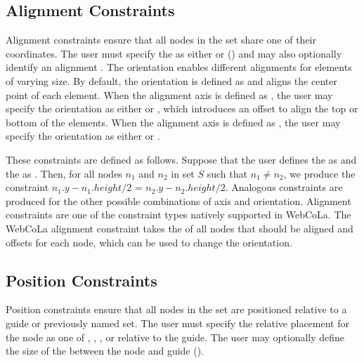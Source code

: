 \subsection{Alignment Constraints}
Alignment constraints ensure that all nodes in the set share one of their
coordinates. The user must specify the 
as either  or  () 
and may also optionally identify an alignment .
The orientation enables different alignments for elements of varying size. 
By default, the orientation is defined as 
and aligns the center point of each element. When the alignment axis is defined as ,
the user may specify the orientation as either  or , which introduces
an offset to align the top or bottom of the elements. When the alignment axis is 
defined as , the user may specify the orientation as either 
 or .

These constraints are defined as follows. Suppose that the user defines the 
as  and the  as .  Then, for all
nodes $n_1$ and $n_2$ in set $S$ such that $n_1 \neq n_2$, we produce the constraint
$n_1.y - n_1.height/2$ = $n_2.y - n_2.height/2$.
Analogous constraints are produced for the other possible combinations of axis and orientation.
Alignment constraints are one of the constraint types natively supported in
WebCoLa. The WebCoLa alignment constraint takes the  of all nodes
that should be aligned and offsets for each node, which can be used to change the orientation.

\vspace{-5px}
\subsection{Position Constraints}
Position constraints ensure that all nodes in the set are positioned relative to
a guide or previously named set. The user must specify the relative
placement for the node as one of , , 
, or  relative to the guide.
The user may optionally define the size of the 
between the node and guide ().

